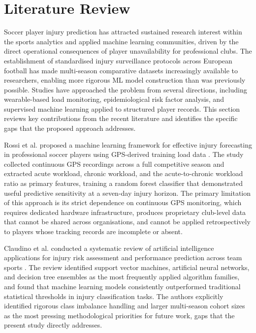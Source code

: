\documentclass[conference]{IEEEtran}
\begin{document}
\section{Literature Review}
Soccer player injury prediction has attracted sustained research interest within the sports analytics and applied machine learning communities, driven by the direct operational consequences of player unavailability for professional clubs. The establishment of standardised injury surveillance protocols across European football \cite{fuller2006consensus} has made multi-season comparative datasets increasingly available to researchers, enabling more rigorous ML model construction than was previously possible. Studies have approached the problem from several directions, including wearable-based load monitoring, epidemiological risk factor analysis, and supervised machine learning applied to structured player records. This section reviews key contributions from the recent literature and identifies the specific gaps that the proposed approach addresses.

Rossi et al. proposed a machine learning framework for effective injury forecasting in professional soccer players using GPS-derived training load data \cite{rossi2018effective}. The study collected continuous GPS recordings across a full competitive season and extracted acute workload, chronic workload, and the acute-to-chronic workload ratio as primary features, training a random forest classifier \cite{breiman2001random} that demonstrated useful predictive sensitivity at a seven-day injury horizon. The primary limitation of this approach is its strict dependence on continuous GPS monitoring, which requires dedicated hardware infrastructure, produces proprietary club-level data that cannot be shared across organisations, and cannot be applied retrospectively to players whose tracking records are incomplete or absent.

Claudino et al. conducted a systematic review of artificial intelligence applications for injury risk assessment and performance prediction across team sports \cite{claudino2019current}. The review identified support vector machines, artificial neural networks, and decision tree ensembles as the most frequently applied algorithm families, and found that machine learning models consistently outperformed traditional statistical thresholds in injury classification tasks. The authors explicitly identified rigorous class imbalance handling and larger multi-season cohort sizes as the most pressing methodological priorities for future work, gaps that the present study directly addresses.
\end{document}
